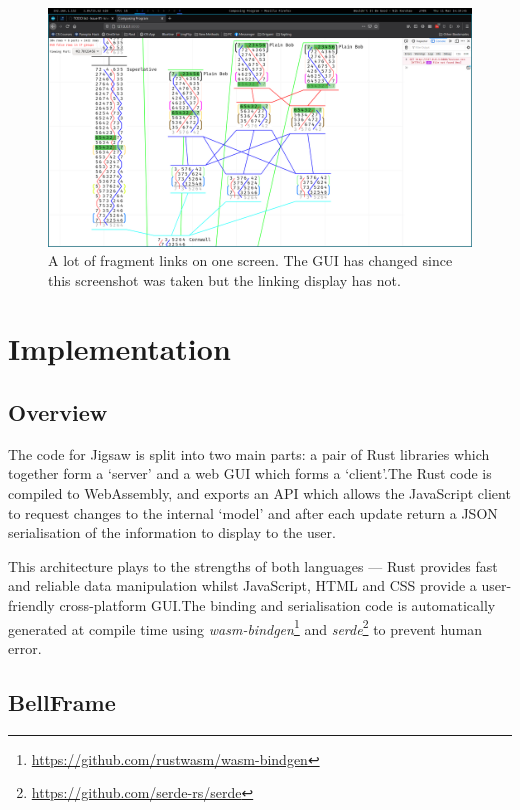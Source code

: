 \documentclass[12pt]{article}
\newcommand{\footurl}[1]{\footnote{\url{#1}}}
\begin{document}
\begin{figure}[h!]
    \centering
    \includegraphics[width=\textwidth]{linking-insane}
    \caption{A lot of fragment links on one screen.  The GUI has changed since this screenshot
    was taken but the linking display has not.}\label{fig:linking-insane}
\end{figure}



\pagebreak

\section{Implementation}

\subsection{Overview}

The code for Jigsaw is split into two main parts: a pair of Rust libraries which together form a `server'
and a web GUI which forms a `client'.\@  The Rust code is compiled to WebAssembly, and exports an
API which allows the JavaScript client to request changes to the internal `model' and after each
update return a
JSON serialisation of the information to display to the user.

This architecture plays to the strengths of both languages --- Rust provides fast and reliable data
manipulation whilst JavaScript, HTML and CSS provide a user-friendly cross-platform GUI.\@  The
binding and serialisation code is automatically generated at compile time using
\emph{wasm-bindgen}\footurl{https://github.com/rustwasm/wasm-bindgen} and
\emph{serde}\footurl{https://github.com/serde-rs/serde} to prevent human error.

\subsection{BellFrame}
\end{document}
